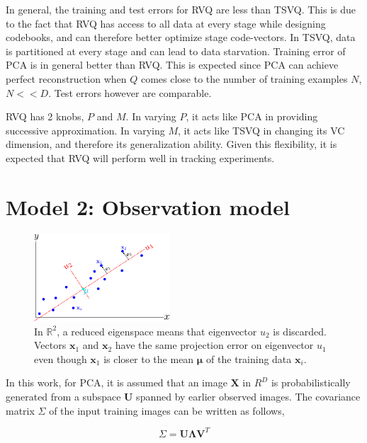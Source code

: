 In general, the training and test errors for RVQ are less than TSVQ. This is due to the fact that RVQ has access to all data at every stage while designing codebooks, and can therefore better optimize stage code-vectors. In TSVQ, data is partitioned at every stage and can lead to data starvation.
Training error of PCA is in general better than RVQ. This is expected since PCA can achieve perfect reconstruction when $Q$ comes close to the number of training examples $N$, $N<<D$. Test errors however are comparable.

RVQ has 2 knobs, $P$ and $M$. In varying $P$, it acts like PCA in providing successive approximation. In varying $M$, it acts like TSVQ in changing its VC dimension, and therefore its generalization ability.
Given this flexibility, it is expected that RVQ will perform well in tracking experiments.

\section{Model 2: Observation model}
								\begin{figure}
								\centering
								\includegraphics[width=0.45\textwidth]{thesis/PRML_PCA_problem.pdf}
								\caption{In $\mathbb{R}^2$, a reduced eigenspace means that eigenvector $u_2$ is discarded.  Vectors $\mathbf{x}_1$ and $\mathbf{x}_2$ have the same projection error on eigenvector $u_1$ even though $\mathbf{x}_1$ is closer to the mean $\boldsymbol\mu$ of the training data $\mathbf{x}_i$.}
								\label{fig:PRML_PCA_problem}
								\end{figure}
		

In this work, for PCA, it is assumed that an image $\mathbf{X}$ in $R^D$ is probabilistically generated from a subspace $\mathbf{U}$ spanned by earlier observed images.  The covariance matrix $\Sigma$ of the input training images can be written as follows,  

\begin{equation}
\Sigma = \mathbf{U}\mathbf{\Lambda} \mathbf{V}^T
\end{equation}

